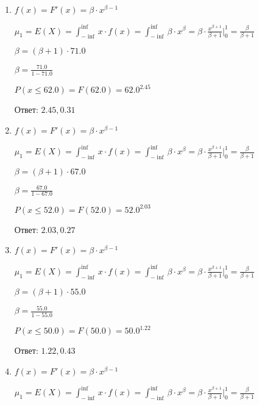 \documentclass[a4paper,12pt]{article}
\begin{document}
\begin{enumerate}
\item

	

	$f(x) = F'(x) = \beta \cdot x^{\beta - 1}$

	$\mu_{1} = E(X) = \int_{-\inf}^{\inf}x \cdot f(x) = \int_{-\inf}^{\inf} \beta \cdot x^{\beta} = \beta \cdot \frac{x^{\beta + 1}}{\beta + 1}\bigg|_0^1 = \frac{\beta}{\beta + 1}$

	$\beta = (\beta + 1) \cdot 71.0$

	$\beta = \frac{71.0}{1 - 71.0}$

	$ P(x \le 62.0) = F(62.0) = 62.0^{2.45} $

    Ответ: $2.45, 0.31$
	


\item

	

	$f(x) = F'(x) = \beta \cdot x^{\beta - 1}$

	$\mu_{1} = E(X) = \int_{-\inf}^{\inf}x \cdot f(x) = \int_{-\inf}^{\inf} \beta \cdot x^{\beta} = \beta \cdot \frac{x^{\beta + 1}}{\beta + 1}\bigg|_0^1 = \frac{\beta}{\beta + 1}$

	$\beta = (\beta + 1) \cdot 67.0$

	$\beta = \frac{67.0}{1 - 67.0}$

	$ P(x \le 52.0) = F(52.0) = 52.0^{2.03} $

    Ответ: $2.03, 0.27$
	


\item

	

	$f(x) = F'(x) = \beta \cdot x^{\beta - 1}$

	$\mu_{1} = E(X) = \int_{-\inf}^{\inf}x \cdot f(x) = \int_{-\inf}^{\inf} \beta \cdot x^{\beta} = \beta \cdot \frac{x^{\beta + 1}}{\beta + 1}\bigg|_0^1 = \frac{\beta}{\beta + 1}$

	$\beta = (\beta + 1) \cdot 55.0$

	$\beta = \frac{55.0}{1 - 55.0}$

	$ P(x \le 50.0) = F(50.0) = 50.0^{1.22} $

    Ответ: $1.22, 0.43$
	


\item

	

	$f(x) = F'(x) = \beta \cdot x^{\beta - 1}$

	$\mu_{1} = E(X) = \int_{-\inf}^{\inf}x \cdot f(x) = \int_{-\inf}^{\inf} \beta \cdot x^{\beta} = \beta \cdot \frac{x^{\beta + 1}}{\beta + 1}\bigg|_0^1 = \frac{\beta}{\beta + 1}$


\end{enumerate}
\end{document}
